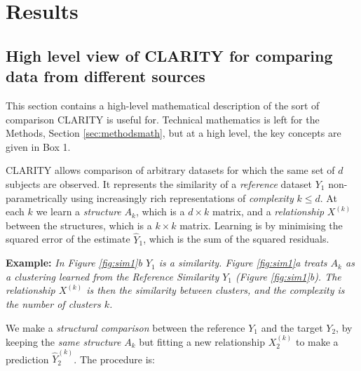 \documentclass[a4]{article}
\newcommand{\+}[1]{\mathbf{#1}}
\begin{document}
\section{Results}
\label{sec:results}

\subsection{High level view of CLARITY for comparing data from different sources}
\label{sec:claritydef}

This section contains a high-level mathematical description of the sort of comparison CLARITY is useful for. Technical mathematics is left for the Methods, Section \ref{sec:methodsmath}, but at a high level, the key concepts are given in Box 1.

CLARITY allows comparison of arbitrary datasets for which the same set of $d$ subjects are observed.
It represents the similarity of a \emph{reference} dataset $Y_1$ non-parametrically using increasingly rich representations of \emph{complexity}  $k \le d$.  At each $k$ we learn a \emph{structure} $A_k$, which is a $d \times k$ matrix, and a \emph{relationship} $X^{(k)}$ between the structures, which is a $k \times k$ matrix. Learning is by minimising the squared error of the estimate $\hat{Y}_1$, which is the sum of the squared residuals.

\textbf{Example:} {\it In Figure \ref{fig:sim1}b $Y_1$ is a similarity. Figure \ref{fig:sim1}a treats $A_k$ as a clustering learned from the Reference Similarity $Y_1$ (Figure \ref{fig:sim1}b). The relationship $X^{(k)}$ is then the similarity between clusters, and the complexity is the number of clusters $k$.}

We make a \emph{structural comparison} between the reference $Y_1$ and the target $Y_2$, by keeping the \emph{same structure}  $A_k$ but fitting a new relationship $X_{2}^{(k)}$ to make a prediction $\hat{Y}_{2}^{(k)}$.
The procedure is:
\end{document}
